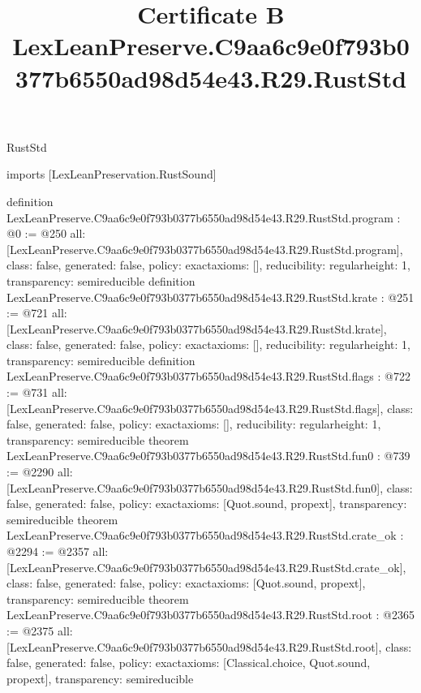 \begin{lexlean}{RustStd}
\title{Certificate B LexLeanPreserve.C9aa6c9e0f793b0377b6550ad98d54e43.R29.RustStd}
\begin{coremodule}
imports [LexLeanPreservation.RustSound]

definition LexLeanPreserve.C9aa6c9e0f793b0377b6550ad98d54e43.R29.RustStd.program : @0 := @250 {
  all: [LexLeanPreserve.C9aa6c9e0f793b0377b6550ad98d54e43.R29.RustStd.program],
  class: false,
  generated: false,
  policy: exact{axioms: []},
  reducibility: regular{height: 1},
  transparency: semireducible
}
definition LexLeanPreserve.C9aa6c9e0f793b0377b6550ad98d54e43.R29.RustStd.krate : @251 := @721 {
  all: [LexLeanPreserve.C9aa6c9e0f793b0377b6550ad98d54e43.R29.RustStd.krate],
  class: false,
  generated: false,
  policy: exact{axioms: []},
  reducibility: regular{height: 1},
  transparency: semireducible
}
definition LexLeanPreserve.C9aa6c9e0f793b0377b6550ad98d54e43.R29.RustStd.flags : @722 := @731 {
  all: [LexLeanPreserve.C9aa6c9e0f793b0377b6550ad98d54e43.R29.RustStd.flags],
  class: false,
  generated: false,
  policy: exact{axioms: []},
  reducibility: regular{height: 1},
  transparency: semireducible
}
theorem LexLeanPreserve.C9aa6c9e0f793b0377b6550ad98d54e43.R29.RustStd.fun0 : @739 := @2290 {
  all: [LexLeanPreserve.C9aa6c9e0f793b0377b6550ad98d54e43.R29.RustStd.fun0],
  class: false,
  generated: false,
  policy: exact{axioms: [Quot.sound, propext]},
  transparency: semireducible
}
theorem LexLeanPreserve.C9aa6c9e0f793b0377b6550ad98d54e43.R29.RustStd.crate_ok : @2294 := @2357 {
  all: [LexLeanPreserve.C9aa6c9e0f793b0377b6550ad98d54e43.R29.RustStd.crate_ok],
  class: false,
  generated: false,
  policy: exact{axioms: [Quot.sound, propext]},
  transparency: semireducible
}
theorem LexLeanPreserve.C9aa6c9e0f793b0377b6550ad98d54e43.R29.RustStd.root : @2365 := @2375 {
  all: [LexLeanPreserve.C9aa6c9e0f793b0377b6550ad98d54e43.R29.RustStd.root],
  class: false,
  generated: false,
  policy: exact{axioms: [Classical.choice, Quot.sound, propext]},
  transparency: semireducible
}


\end{coremodule}
\end{lexlean}
